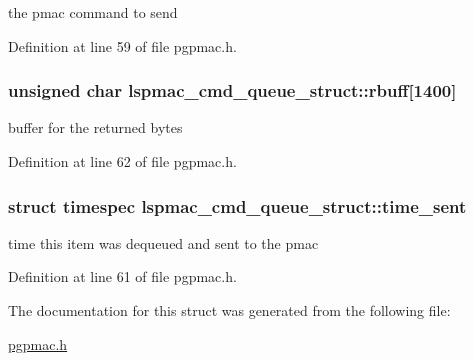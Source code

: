 the pmac command to send 

Definition at line 59 of file pgpmac.h.\hypertarget{structlspmac__cmd__queue__struct_aa059563886db174f9bb4f7a14bc19bbe}{
\subsubsection[{rbuff}]{\setlength{\rightskip}{0pt plus 5cm}unsigned char {\bf lspmac\_\-cmd\_\-queue\_\-struct::rbuff}\mbox{[}1400\mbox{]}}}
\label{structlspmac__cmd__queue__struct_aa059563886db174f9bb4f7a14bc19bbe}


buffer for the returned bytes 

Definition at line 62 of file pgpmac.h.\hypertarget{structlspmac__cmd__queue__struct_a276ebc4b35c2554e4cb7377b60fd89b7}{
\subsubsection[{time\_\-sent}]{\setlength{\rightskip}{0pt plus 5cm}struct timespec {\bf lspmac\_\-cmd\_\-queue\_\-struct::time\_\-sent}}}
\label{structlspmac__cmd__queue__struct_a276ebc4b35c2554e4cb7377b60fd89b7}


time this item was dequeued and sent to the pmac 

Definition at line 61 of file pgpmac.h.

The documentation for this struct was generated from the following file:\begin{DoxyCompactItemize}
\item 
\hyperlink{pgpmac_8h}{pgpmac.h}\end{DoxyCompactItemize}

